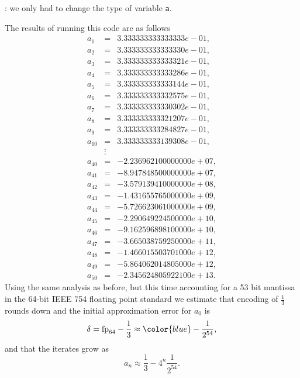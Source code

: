 : we only had to change the type of variable \texttt{a}.

\vspace{8pt}\noindent The results of running this code are as follows
\small
\begin{eqnarray*}
a_{1} &=& 3.333333333333333e-01, \\ 
a_{2} &=& 3.333333333333330e-01, \\ 
a_{3} &=& 3.333333333333321e-01, \\ 
a_{4} &=& 3.333333333333286e-01, \\ 
a_{5} &=& 3.333333333333144e-01, \\ 
a_{6} &=& 3.333333333332575e-01, \\ 
a_{7} &=& 3.333333333330302e-01, \\ 
a_{8} &=& 3.333333333321207e-01, \\ 
a_{9} &=& 3.333333333284827e-01, \\ 
a_{10} &=& 3.333333333139308e-01, \\ 
 & \vdots & \\
a_{40} &=& -2.236962100000000e+07, \\ 
a_{41} &=& -8.947848500000000e+07, \\ 
a_{42} &=& -3.579139410000000e+08, \\ 
a_{43} &=& -1.431655765000000e+09, \\ 
a_{44} &=& -5.726623061000000e+09, \\ 
a_{45} &=& -2.290649224500000e+10, \\ 
a_{46} &=& -9.162596898100000e+10, \\ 
a_{47} &=& -3.665038759250000e+11, \\ 
a_{48} &=& -1.466015503701000e+12, \\ 
a_{49} &=& -5.864062014805000e+12, \\ 
a_{50} &=& -2.345624805922100e+13.
\end{eqnarray*}
\normalsize
Using the same analysis as before, but this time accounting for a 53 bit mantissa in the 64-bit IEEE 754 floating point standard we estimate that encoding of $\frac13$ rounds down and the initial approximation error for $a_0$ is
\[
\delta = \mbox{fp}_{64} - \frac13 \approx {\color{blue}-\frac{1}{2^{54}}},
\]
and that the iterates grow as
\[
a_n \approx \frac13  - 4^n \frac{1}{2^{54}} .
\]
